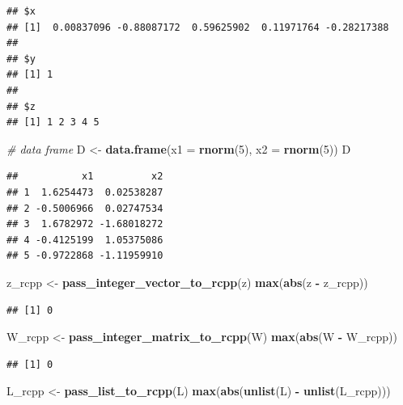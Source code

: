 \documentclass[]{book}
\newenvironment{Shaded}{\begin{snugshade}}{\end{snugshade}}
\newcommand{\KeywordTok}[1]{\textcolor[rgb]{0.13,0.29,0.53}{\textbf{#1}}}
\newcommand{\DataTypeTok}[1]{\textcolor[rgb]{0.13,0.29,0.53}{#1}}
\newcommand{\DecValTok}[1]{\textcolor[rgb]{0.00,0.00,0.81}{#1}}
\newcommand{\StringTok}[1]{\textcolor[rgb]{0.31,0.60,0.02}{#1}}
\newcommand{\CommentTok}[1]{\textcolor[rgb]{0.56,0.35,0.01}{\textit{#1}}}
\newcommand{\OperatorTok}[1]{\textcolor[rgb]{0.81,0.36,0.00}{\textbf{#1}}}
\newcommand{\NormalTok}[1]{#1}
\begin{document}
\begin{verbatim}
## $x
## [1]  0.00837096 -0.88087172  0.59625902  0.11971764 -0.28217388
## 
## $y
## [1] 1
## 
## $z
## [1] 1 2 3 4 5
\end{verbatim}

\begin{Shaded}
\begin{Highlighting}[]
\CommentTok{# data frame}
\NormalTok{D <-}\StringTok{ }\KeywordTok{data.frame}\NormalTok{(}\DataTypeTok{x1 =} \KeywordTok{rnorm}\NormalTok{(}\DecValTok{5}\NormalTok{), }\DataTypeTok{x2 =} \KeywordTok{rnorm}\NormalTok{(}\DecValTok{5}\NormalTok{))}
\NormalTok{D}
\end{Highlighting}
\end{Shaded}

\begin{verbatim}
##           x1          x2
## 1  1.6254473  0.02538287
## 2 -0.5006966  0.02747534
## 3  1.6782972 -1.68018272
## 4 -0.4125199  1.05375086
## 5 -0.9722868 -1.11959910
\end{verbatim}

\begin{Shaded}
\begin{Highlighting}[]
\NormalTok{z_rcpp <-}\StringTok{ }\KeywordTok{pass_integer_vector_to_rcpp}\NormalTok{(z)}
\KeywordTok{max}\NormalTok{(}\KeywordTok{abs}\NormalTok{(z }\OperatorTok{-}\StringTok{ }\NormalTok{z_rcpp))}
\end{Highlighting}
\end{Shaded}

\begin{verbatim}
## [1] 0
\end{verbatim}

\begin{Shaded}
\begin{Highlighting}[]
\NormalTok{W_rcpp <-}\StringTok{ }\KeywordTok{pass_integer_matrix_to_rcpp}\NormalTok{(W)}
\KeywordTok{max}\NormalTok{(}\KeywordTok{abs}\NormalTok{(W }\OperatorTok{-}\StringTok{ }\NormalTok{W_rcpp))}
\end{Highlighting}
\end{Shaded}

\begin{verbatim}
## [1] 0
\end{verbatim}

\begin{Shaded}
\begin{Highlighting}[]
\NormalTok{L_rcpp <-}\StringTok{ }\KeywordTok{pass_list_to_rcpp}\NormalTok{(L)}
\KeywordTok{max}\NormalTok{(}\KeywordTok{abs}\NormalTok{(}\KeywordTok{unlist}\NormalTok{(L) }\OperatorTok{-}\StringTok{ }\KeywordTok{unlist}\NormalTok{(L_rcpp)))}
\end{Highlighting}
\end{Shaded}
\end{document}
